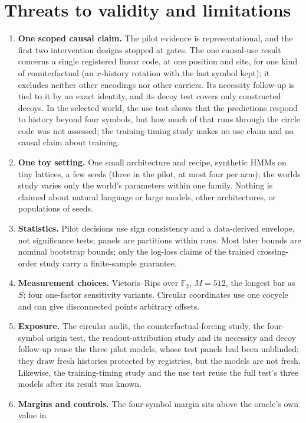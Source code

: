 \documentclass[11pt,a4paper]{article}
\DeclareRobustCommand{\_}{\ifmmode\origunderscore\else\textunderscore\allowbreak\fi}
\begin{document}
\section{Threats to validity and limitations}\label{sec:threats}
\begin{enumerate}
\item \textbf{One scoped causal claim.} The pilot evidence is representational, and the first two
intervention designs stopped at gates. The one causal-use result concerns a single registered
linear code, at one position and site, for one kind of counterfactual (an $x$-history rotation
with the last symbol kept); it excludes neither other encodings nor other carriers. Its necessity
follow-up is tied to it by an exact identity, and its decoy test covers only constructed decoys.
In the selected world, the use test shows that the predictions respond to history beyond four
symbols, but how much of that runs through the circle code was not assessed; the training-timing
study makes no use claim and no causal claim about training.
\item \textbf{One toy setting.} One small architecture and recipe, synthetic HMMs on tiny lattices,
a few seeds (three in the pilot, at most four per arm); the worlds study varies only the world's
parameters within one family. Nothing is claimed about natural language
or large models, other architectures, or populations of seeds.
\item \textbf{Statistics.} Pilot decisions use sign consistency and a data-derived envelope, not
significance tests; panels are partitions within runs. Most later bounds are nominal bootstrap
bounds; only the log-loss claims of the trained crossing-order study carry a finite-sample
guarantee.
\item \textbf{Measurement choices.} Vietoris--Rips over $\mathbb{F}_2$, $M=512$, the longest bar as
$S$; four one-factor sensitivity variants. Circular coordinates use one cocycle and can give
disconnected points arbitrary offsets.
\item \textbf{Exposure.} The circular audit, the counterfactual-forcing study, the four-symbol
origin test, the readout-attribution study and its necessity and decoy follow-up reuse the
three pilot models, whose test panels
had been unblinded; they draw fresh histories protected by registries, but the models are not
fresh. Likewise, the training-timing study and the use test reuse the full test's three models
after its result was known.
\item \textbf{Margins and controls.} The four-symbol margin sits above the oracle's own value in

\end{enumerate}
\end{document}
